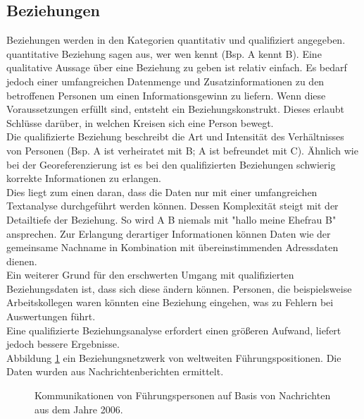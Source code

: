 \documentclass[twoside,a4paper]{article}
\begin{document}
\subsection{Beziehungen}
Beziehungen werden in den Kategorien quantitativ und qualifiziert angegeben.\\
quantitative Beziehung sagen aus, wer wen kennt (Bsp. A kennt B). Eine qualitative Aussage über eine Beziehung zu geben ist relativ einfach. Es bedarf jedoch einer umfangreichen Datenmenge und Zusatzinformationen zu den betroffenen Personen um einen Informationsgewinn zu liefern. Wenn diese Voraussetzungen erfüllt sind, entsteht ein Beziehungskonstrukt. Dieses erlaubt Schlüsse darüber, in welchen Kreisen sich eine Person bewegt.\\
Die qualifizierte Beziehung beschreibt die Art und Intensität des Verhältnisses von Personen (Bsp. A ist verheiratet mit B; A ist befreundet mit C). Ähnlich wie bei der Georeferenzierung ist es bei den qualifizierten Beziehungen schwierig korrekte Informationen zu erlangen. \\
Dies liegt zum einen daran, dass die Daten nur mit einer umfangreichen Textanalyse durchgeführt werden können. Dessen Komplexität steigt mit der Detailtiefe der Beziehung. So wird A B niemals mit "hallo meine Ehefrau B" ansprechen. Zur Erlangung derartiger Informationen können Daten wie der gemeinsame Nachname in Kombination mit übereinstimmenden Adressdaten dienen.\\
Ein weiterer Grund für den erschwerten Umgang mit qualifizierten Beziehungsdaten ist, dass sich diese ändern können. Personen, die beispielsweise Arbeitskollegen waren könnten eine Beziehung eingehen, was zu Fehlern bei Auswertungen führt.\\
Eine qualifizierte Beziehungsanalyse erfordert einen größeren Aufwand, liefert jedoch bessere Ergebnisse.\\
Abbildung \ref{img:Beziehungen} ein Beziehungsnetzwerk von weltweiten Führungspositionen. Die Daten wurden aus Nachrichtenberichten ermittelt.

\begin{figure}[h!]
  \centering
  \caption{Kommunikationen von Führungspersonen auf Basis von Nachrichten aus dem Jahre 2006. \cite{challanges_in_osint}}
  \label{img:Beziehungen}
\end{figure}
\end{document}
